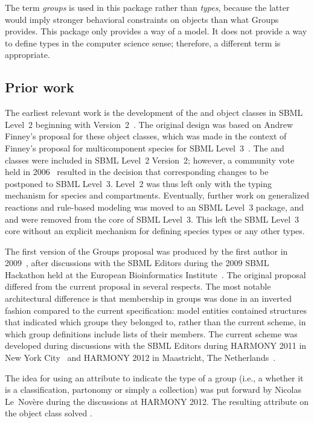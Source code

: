 The term \emph{groups} is used in this package rather than \emph{types}, because the latter would imply stronger behavioral constraints on objects than what Groups provides. This package only provides a way of  a model.  It does not provide a way to define types in the computer science sense; therefore, a different term is appropriate.


\subsection{Prior work}

The earliest relevant work is the development of the \CompartmentType and \SpeciesType object classes in SBML Level~2 beginning with Version~2~\citep{l2v2}. The original design was based on Andrew Finney's proposal for these object classes, which was made in the context of Finney's proposal for multicomponent species for SBML Level~3~\citep{finney_2004}.  The \SpeciesType and \CompartmentType classes were included in SBML Level~2 Version~2; however, a community vote held in 2006~\citep{vote_2006b} resulted in the decision that corresponding changes to \Reaction be postponed to SBML Level~3.  Level~2 was thus left only with the typing mechanism for species and compartments.  Eventually, further work on generalized reactions and rule-based modeling was moved to an SBML Level~3 package, and \SpeciesType and \CompartmentType were removed from the core of SBML Level~3.  This left the SBML Level~3 core without an explicit mechanism for defining species types or any other types.

The first version of the Groups proposal was produced by the first author in 2009~\citep{hucka_2009}, after discussions with the SBML Editors during the 2009 SBML Hackathon held at the European Bioinformatics Institute~\citep{sbml_hackathon_2009}.  The original proposal differed from the current proposal in several respects. The most notable architectural difference is that membership in groups was done in an inverted fashion compared to the current specification: model entities contained structures that indicated which groups they belonged to, rather than the current scheme, in which group definitions include lists of their members.  The current scheme was developed during discussions with the SBML Editors during HARMONY 2011 in New York City~\citep{harmony_2011} and HARMONY 2012 in Maastricht, The Netherlands~\citep{harmony_2012}.

The idea for using an attribute to indicate the type of a group (i.e., a whether it is a classification, partonomy or simply a collection) was put forward by Nicolas Le~Nov\`{e}re during the discussions at HARMONY 2012.  The resulting attribute  on the \Group object class solved .

